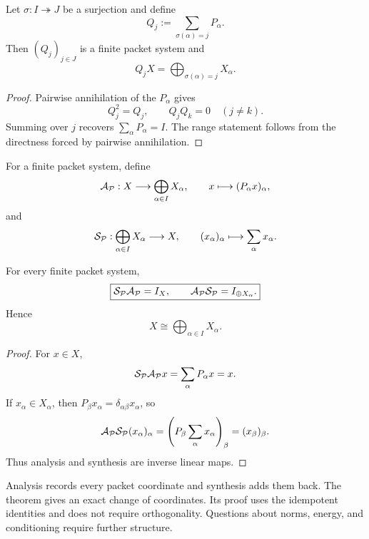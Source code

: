 \begin{lemma}
\label{lem:packet-aggregation}
Let $\sigma:I\twoheadrightarrow J$ be a surjection and define
\[
Q_j:=\sum_{\sigma(\alpha)=j}P_\alpha.
\]
Then $(Q_j)_{j\in J}$ is a finite packet system and
\[
Q_jX=\bigoplus_{\sigma(\alpha)=j}X_\alpha.
\]
\end{lemma}

\begin{proof}
Pairwise annihilation of the $P_\alpha$ gives
\[
Q_j^2=Q_j,
\qquad
Q_jQ_k=0\quad(j\neq k).
\]
Summing over $j$ recovers $\sum_\alpha P_\alpha=I$.  The range statement follows from the directness forced by pairwise annihilation.
\end{proof}

\begin{definition}
\label{def:analysis-synthesis}
For a finite packet system, define
\[
\mathcal A_{\mathcal P}:X\longrightarrow\bigoplus_{\alpha\in I}X_\alpha,
\qquad
x\longmapsto(P_\alpha x)_\alpha,
\]
and
\[
\mathcal S_{\mathcal P}:\bigoplus_{\alpha\in I}X_\alpha\longrightarrow X,
\qquad
(x_\alpha)_\alpha\longmapsto\sum_\alpha x_\alpha.
\]
\end{definition}

\begin{theorem}
\label{thm:exact-packet-coordinates}
For every finite packet system,
\[
\boxed{
\mathcal S_{\mathcal P}\mathcal A_{\mathcal P}=I_X,
\qquad
\mathcal A_{\mathcal P}\mathcal S_{\mathcal P}=I_{\oplus X_\alpha}.
}
\]
Hence
\[
\boxed{X\cong\bigoplus_{\alpha\in I}X_\alpha.}
\]
\end{theorem}

\begin{proof}
For $x\in X$,
\[
\mathcal S_{\mathcal P}\mathcal A_{\mathcal P}x
=
\sum_\alpha P_\alpha x
=x.
\]
If $x_\alpha\in X_\alpha$, then $P_\beta x_\alpha=\delta_{\alpha\beta}x_\alpha$, so
\[
\mathcal A_{\mathcal P}\mathcal S_{\mathcal P}(x_\alpha)_\alpha
=
\left(P_\beta\sum_\alpha x_\alpha\right)_\beta
=(x_\beta)_\beta.
\]
Thus analysis and synthesis are inverse linear maps.
\end{proof}

\begin{keyidea}
Analysis records every packet coordinate and synthesis adds them back.  The theorem gives an exact change of coordinates.  Its proof uses the idempotent identities and does not require orthogonality.  Questions about norms, energy, and conditioning require further structure.
\end{keyidea}


